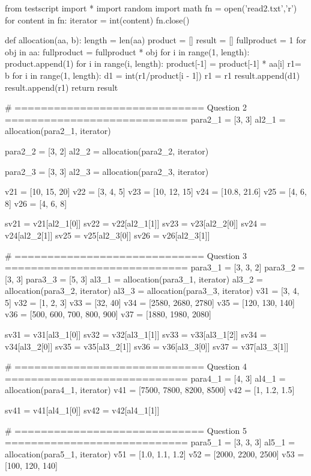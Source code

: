 \documentclass[a4paper,11pt]{article}
\begin{document}
\begin{pycode}
	from testscript import *
	import random
	import math
	fn = open('read2.txt','r')
	for content in fn:
		iterator = int(content)
	fn.close()
	
	def allocation(aa, b):
		length = len(aa)
		product = []
		result = []
		fullproduct = 1
		for obj in aa:
			fullproduct = fullproduct * obj
		for i in range(1, length):
			product.append(1)
			for i in range(i, length):
				product[-1] = product[-1] * aa[i]
		r1= b%
		for i in range(1, length):
			d1 = int(r1/product[i - 1])
			r1 = r1%
			result.append(d1)
		result.append(r1)
		return result
	
	# ============================= Question 2 ============================
	para2_1 = [3, 3]
	al2_1 = allocation(para2_1, iterator)
	
	para2_2 = [3, 2]
	al2_2 = allocation(para2_2, iterator)
	
	para2_3 = [3, 3]
	al2_3 = allocation(para2_3, iterator)
		
	v21 = [10, 15, 20]
	v22 = [3, 4, 5]
	v23 = [10, 12, 15]
	v24 = [10.8, 21.6]
	v25 = [4, 6, 8]
	v26 = [4, 6, 8]
	
	sv21 = v21[al2_1[0]]
	sv22 = v22[al2_1[1]]
	sv23 = v23[al2_2[0]]
	sv24 = v24[al2_2[1]]
	sv25 = v25[al2_3[0]]
	sv26 = v26[al2_3[1]]
	
	# ============================= Question 3 ============================
	para3_1 = [3, 3, 2]
	para3_2 = [3, 3]
	para3_3 = [5, 3]
	al3_1 = allocation(para3_1, iterator)
	al3_2 = allocation(para3_2, iterator)
	al3_3 = allocation(para3_3, iterator)
	v31 = [3, 4, 5]
	v32 = [1, 2, 3]
	v33 = [32, 40]
	v34 = [2580, 2680, 2780]
	v35 = [120, 130, 140]
	v36 = [500, 600, 700, 800, 900]
	v37 = [1880, 1980, 2080]
	
	sv31 = v31[al3_1[0]]
	sv32 = v32[al3_1[1]]
	sv33 = v33[al3_1[2]]
	sv34 = v34[al3_2[0]]
	sv35 = v35[al3_2[1]]
	sv36 = v36[al3_3[0]]
	sv37 = v37[al3_3[1]]
	
	# ============================= Question 4 ============================
	para4_1 = [4, 3]
	al4_1 = allocation(para4_1, iterator)
	v41 = [7500, 7800, 8200, 8500]
	v42 = [1, 1.2, 1.5]
	
	sv41 = v41[al4_1[0]]
	sv42 = v42[al4_1[1]]
	
	# ============================= Question 5 ============================
	para5_1 = [3, 3, 3]
	al5_1 = allocation(para5_1, iterator)
	v51 = [1.0, 1.1, 1.2]
	v52 = [2000, 2200, 2500]
	v53 = [100, 120, 140]
	

\end{pycode}
\end{document}
